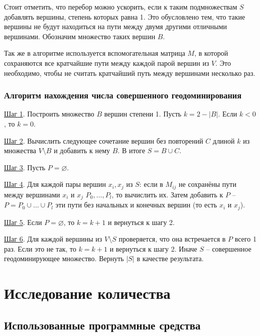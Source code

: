 \documentclass[bachelor, och, nir]{SCWorks}
\begin{document}
Стоит отметить, что перебор можно ускорить, если к таким подмножествам $S$ 
добавлять вершины, степень которых равна 1. Это обусловлено тем, что такие вершины не будут
находиться на пути между двумя другими отличными вершинами. Обозначим множество
таких вершин $B$.

Так же в алгоритме используется вспомогательная матрица $M$, в которой сохраняются
все кратчайшие пути между каждой парой вершин из $V$. Это необходимо, чтобы не считать
кратчайший путь между вершинами несколько раз.


\subsubsection{Алгоритм нахождения числа совершенного геодоминирования}

\underline{Шаг 1}. Построить множество $B$ вершин степени 1. 
Пусть $k = 2 - |B|$. Если $k < 0$, то $k = 0$. 

\underline{Шаг 2}. Вычислить следующее сочетание вершин без повторений $C$ длиной $k$ из множества
$V \setminus B$ и добавить к нему $B$. В итоге $S = B \cup C$.

\underline{Шаг 3}. Пусть $P = \varnothing$.

\underline{Шаг 4}. Для каждой пары вершин $x_i, x_j$ из $S$: если в $M_{ij}$ не сохранёны пути между вершинами
$x_i$ и $x_j$ $P_0, \dots, P_l$, то вычислить их. Затем добавить к $P$ -- $P = P_0 \cup \dots \cup P_l$ эти пути без начальных и конечных вершин (то есть $x_i$ и $x_j$).

\underline{Шаг 5}. Если $P = \varnothing$, то $k = k + 1$ и вернуться к шагу 2.

\underline{Шаг 6}. Для каждой вершины из $V \setminus S$ проверяется, что она встречается
в $P$ всего 1 раз. Если это не так, то $k = k + 1$ и вернуться к шагу 2. Иначе $S$ --
совершенное геодоминирующее множество. Вернуть $|S|$ в качестве результата.

\section{Исследование количества}
\subsection{Использованные программные средства}
\end{document}
